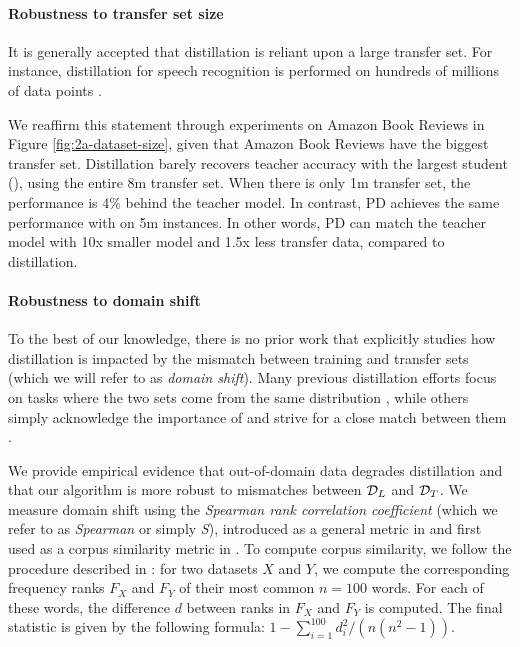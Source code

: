 \paragraph{Robustness to transfer set size}
 It is generally accepted that distillation is reliant upon a large transfer set. For instance, distillation for speech recognition is performed on hundreds of millions of data points \citep{distillation-dnn,distillation}.
 
We reaffirm this statement through experiments on Amazon Book Reviews in Figure \ref{fig:2a-dataset-size}, given that Amazon Book Reviews have the biggest transfer set. 
Distillation barely recovers teacher accuracy with the largest student (\bertbase), using the entire 8m transfer set. When there is only 1m transfer set, the performance is 4\% behind the teacher model.
%
In contrast, PD achieves the same performance with \bertmini on 5m instances. In other words, 
PD can match the teacher model with 10x smaller model and 1.5x less transfer data,
compared to distillation.

\paragraph{Robustness to domain shift} 
To the best of our knowledge, there is no prior work that explicitly studies how distillation is impacted by the mismatch between training and transfer sets (which we will refer to as \emph{domain shift}). Many previous distillation efforts focus on tasks where the two sets come from the same distribution \citep{fitnets, distillation}, while others simply acknowledge the importance of and strive for a close match between them \cite{model-compression}.

We provide empirical evidence that out-of-domain data degrades distillation and that our algorithm is more robust to mismatches between $\mathcal{D}_{L}$ and $\mathcal{D}_{T}$. We measure domain shift using the {\em Spearman rank correlation coefficient} (which we refer to as \emph{Spearman} or simply \emph{S}), introduced as a general metric in \cite{spearman-original} and first used as a corpus similarity metric in \cite{spearman-similarity}. To compute corpus similarity, we follow the procedure described in \cite{spearman-formula}: for two datasets $X$ and $Y$, we compute the corresponding frequency ranks $F_X$ and $F_Y$ of their most common $n=100$ words. For each of these words, the difference $d$ between ranks in $F_X$ and $F_Y$ is computed. The final statistic is given by the following formula: $1 - \sum_{i=1}^{100} d_i^2 / (n(n^2 - 1))$.

